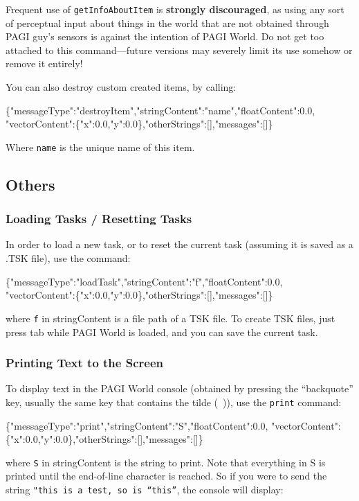 Frequent use of \texttt{getInfoAboutItem} is \textbf{strongly discouraged}, as using any sort of perceptual input about things in the world that are not obtained through PAGI guy's sensors is against the intention of PAGI World. Do not get too attached to this command---future versions may severely limit its use somehow or remove it entirely!

You can also destroy custom created items, by calling:
\begin{center}
	\scriptsize{\{"messageType":"destroyItem","stringContent":"name","floatContent":0.0, "vectorContent":\{"x":0.0,"y":0.0\},"otherStrings":[],"messages":[]\}}
\end{center}
Where \texttt{name} is the unique name of this item. 

\subsection{Others}

\subsubsection{Loading Tasks / Resetting Tasks}

In order to load a new task, or to reset the current task (assuming it is saved as a .TSK file), use the command:

\begin{center}
	\scriptsize{\{"messageType":"loadTask","stringContent":"f","floatContent":0.0, "vectorContent":\{"x":0.0,"y":0.0\},"otherStrings":[],"messages":[]\}}
\end{center}
\noindent where \texttt{f} in stringContent is a file path of a TSK file. To create TSK files, just press tab while PAGI World is loaded, and you can save the current task.

\subsubsection{Printing Text to the Screen}

To display text in the PAGI World console (obtained by pressing the ``backquote'' key, usually the same key that contains the tilde (~)), use the \texttt{print} command:

\begin{center}
\scriptsize{\{"messageType":"print","stringContent":"S","floatContent":0.0, "vectorContent":\{"x":0.0,"y":0.0\},"otherStrings":[],"messages":[]\}}
\end{center}
\noindent where \texttt{S} in stringContent is the string to print. Note that everything in S is printed until the end-of-line character is reached. So if you were to send the string \texttt{"this is a test, so is ``this''}, the console will display:

